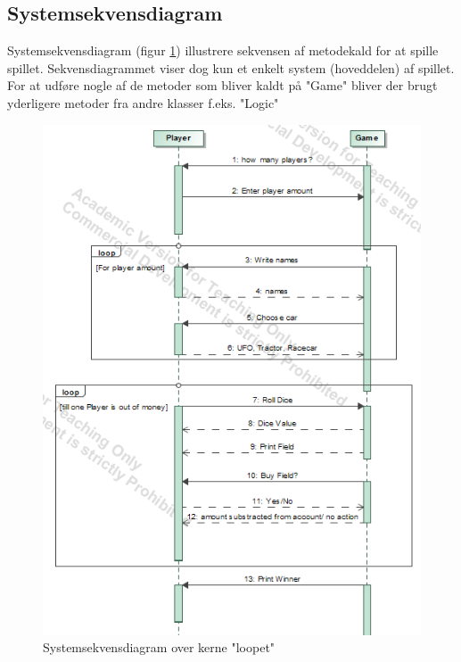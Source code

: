 \subsection{Systemsekvensdiagram}
Systemsekvensdiagram (figur \ref{fig:sysSekdia}) illustrere sekvensen af metodekald for at spille spillet. Sekvensdiagrammet viser dog kun et enkelt system (hoveddelen) af spillet. For at udføre nogle af de metoder som bliver kaldt på "Game" bliver der brugt yderligere metoder fra andre klasser f.eks. "Logic"
\begin{figure}[H]
    \centering
    \includegraphics{sources/6_design/sekvensdiagram.PNG}
    \caption{Systemsekvensdiagram over kerne "loopet"}
    \label{fig:sysSekdia}
\end{figure}